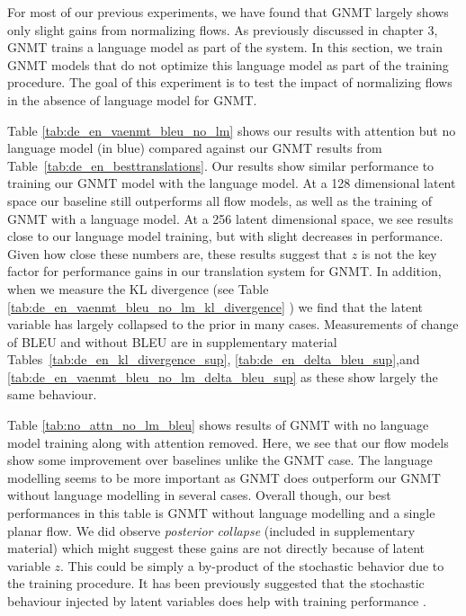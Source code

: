 For most of our previous experiments, we have found that \ac{GNMT} largely shows only slight gains from normalizing flows. As previously discussed in chapter 3, \ac{GNMT} trains a language model as part of the system.  In this section, we train \ac{GNMT} models that do not optimize this language model as part of the training procedure. The goal of this experiment is to test the impact of normalizing flows in the absence of language model for \ac{GNMT}.

Table \ref{tab:de_en_vaenmt_bleu_no_lm} shows our results with attention but no language model (in blue) compared against our \ac{GNMT} results from Table~\ref{tab:de_en_besttranslations}. Our results show similar performance to training our \ac{GNMT} model with the language model. At a 128 dimensional latent space our baseline still outperforms all flow models, as well as the training of \ac{GNMT} with a language model. At a 256 latent dimensional space, we see results close to our language model training, but with slight decreases in performance. Given how close these numbers are, these results suggest that $z$ is not the key factor for performance gains in our translation system for \ac{GNMT}. In addition, when we measure the KL divergence (see Table \ref{tab:de_en_vaenmt_bleu_no_lm_kl_divergence} ) we find that the latent variable has largely collapsed to the prior in many cases. Measurements of change of BLEU and without BLEU are in supplementary material Tables~\ref{tab:de_en_kl_divergence_sup}, \ref{tab:de_en_delta_bleu_sup},and  \ref{tab:de_en_vaenmt_bleu_no_lm_delta_bleu_sup}  as these show largely the same behaviour. 

Table \ref{tab:no_attn_no_lm_bleu} shows results of \ac{GNMT} with no language model training along with attention removed.  Here, we see that our flow models show some improvement over baselines unlike the \ac{GNMT} case. The language modelling seems to be more important as \ac{GNMT} does outperform our \ac{GNMT} without language modelling in several cases. Overall though, our best performances in this table is \ac{GNMT} without language modelling and a single planar flow. We did observe \textit{posterior collapse} (included in supplementary material) which might suggest these gains are not directly because of latent variable $z$. This could be simply a by-product of the stochastic behavior due to the training procedure. It has been previously suggested that the stochastic behaviour injected by latent variables does help with training performance \cite{Zhang2016VNMT}. 



